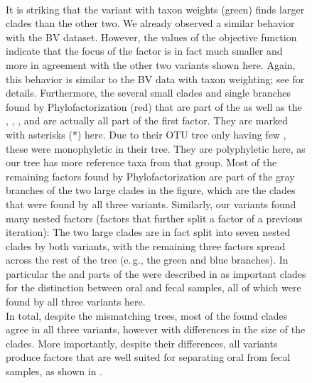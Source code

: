 \begin{figure}[!htb]
{%
        \\
        It is striking that the variant with taxon weights (green) finds larger clades than the other two.
        We already observed a similar behavior with the \ac{BV} dataset. %
        However, the values of the objective function indicate that the focus of the factor is in fact much smaller
        and more in agreement with the other two variants shown here.
        Again, this behavior is similar to the \ac{BV} data with taxon weighting;
        see  for details.
        Furthermore, the several small clades and single branches found by Phylofactorization (red)
        that are part of the  as well as the , ,
        , and  are actually all part of the first factor.
        They are marked with asterisks (*) here.
        Due to their OTU tree only having few , these were monophyletic in their tree.
        They are polyphyletic here, as our tree has more reference taxa from that group.
        Most of the remaining factors found by Phylofactorization are part of the gray branches
        of the two large clades in the figure,
        which are the clades that were found by all three variants.
        Similarly, our variants found many nested factors (factors that further split a factor of a previous iteration):
        The two large clades are in fact split into seven nested clades by both variants,
        with the remaining three factors spread across the rest of the tree (e.\,g., the green and blue branches).
        In particular the  and parts of the 
        were described in \cite{Washburne2017a} as important clades for the distinction between oral and fecal samples,
        all of which were found by all three variants here.
        \\
        In total, despite the mismatching trees, most of the found clades agree in all three variants,
        however with differences in the size of the clades.
        More importantly, despite their differences,
        all variants produce factors that are well suited for separating oral from fecal samples,
        as shown in .
    }
    \label{supp:fig:multi_factors_tree}
\end{figure}

